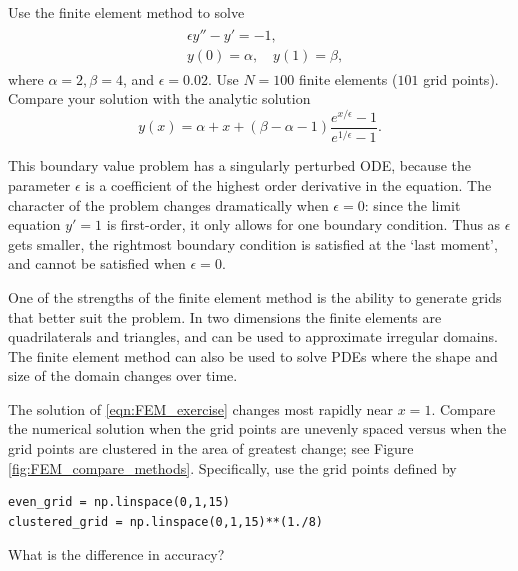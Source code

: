\begin{problem}
Use the finite element method to solve
\begin{align}
	\begin{split}
	&{ }\epsilon y'' - y' = -1,\\
	&{ }y(0) = \alpha, \quad y(1) = \beta,
	\end{split} \label{eqn:FEM_exercise}
\end{align}
where $\alpha = 2, \beta = 4$, and $\epsilon = 0.02$.
Use $N = 100$ finite elements ($101$ grid points).
Compare your solution with the analytic solution
\[y(x) = \alpha + x + (\beta - \alpha - 1 ) \frac{e^{x/\epsilon} -1}{e^{1/\epsilon} -1}.\]

This boundary value problem has a singularly perturbed ODE, because the parameter $\epsilon$ is a coefficient of the highest order derivative in the equation.
The character of the problem changes dramatically when $\epsilon = 0$: since the limit equation $y' = 1$ is first-order, it only allows for one boundary condition.
Thus as $\epsilon$ gets smaller, the rightmost boundary condition is satisfied at the `last moment',  and cannot be satisfied when $\epsilon = 0$.
\end{problem}

\begin{problem}
One of the strengths of the finite element method is the ability to generate grids that better suit the problem.
In two dimensions the finite elements are quadrilaterals and triangles, and can be used to approximate irregular domains.
The finite element method can also be used to solve PDEs where the shape and size of the domain changes over time.

The solution of \eqref{eqn:FEM_exercise} changes most rapidly near $x = 1$.
Compare the numerical solution when the grid points are unevenly spaced versus when the grid points are clustered in the area of greatest change; see Figure \ref{fig:FEM_compare_methods}. Specifically, use the grid points defined by
\begin{lstlisting}
even_grid = np.linspace(0,1,15)
clustered_grid = np.linspace(0,1,15)**(1./8)
\end{lstlisting}
What is the difference in accuracy?
\end{problem}

